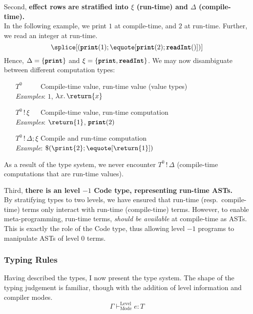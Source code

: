   Second, \textbf{effect rows are stratified into $\xi$ (run-time) and $\Delta$ (compile-time).}\\
  In the following example, we print $1$ at compile-time, and $2$ at run-time. Further, we read an integer at run-time.
\[\splice[(\textbf{\texttt{print}}(1); \equote[\textbf{\texttt{print}}(2); \textbf{\texttt{readInt}}()])]\]
Hence, $\Delta = \{ \textbf{\texttt{print}} \}$ and $\xi = \{ \textbf{\texttt{print}}, \textbf{\texttt{readInt}} \}$. We may now disambiguate between different computation types:
\begin{enumerate}[leftmargin=5.8\parindent]
  \item[$T^0 \quad\quad\,\,$] Compile-time value, run-time value (value types) \\
  \textit{Examples}: $1$, $\lambda x. \, \return{x}$
  \item[$T^0 \, ! \, \xi \quad\;$] Compile-time value, run-time computation  \\
  \textit{Examples}: $\return{1}$, $\textbf{\texttt{print}}(2)$
  \item[$T^0 \, ! \, \Delta; \xi$] Compile and run-time computation \\
  \textit{Example}: $\$(\print{2}; \equote[\return{1}])$
\end{enumerate}
As a result of the type system, we never encounter $T^0 \, ! \, \Delta$ (compile-time computations that are run-time values).

Third, \textbf{there is an level $-1$ \textsf{Code} type, representing run-time ASTs.}\\ 
  By stratifying types to two levels, we have ensured that run-time (resp.\ compile-time) terms only interact with run-time (compile-time) terms. However, to enable meta-programming, run-time terms, \textit{should be available} at compile-time as ASTs. This is exactly the role of the \textsf{Code} type, thus allowing level $-1$ programs to manipulate ASTs of level $0$ terms. 

\subsubsection{Typing Rules}
Having described the types, I now present the type system. The shape of the typing judgement is familiar, though with the addition of level information and compiler modes.
\[\Gamma \vdash^{\text{Level}}_{\text{Mode}} e: T\]

